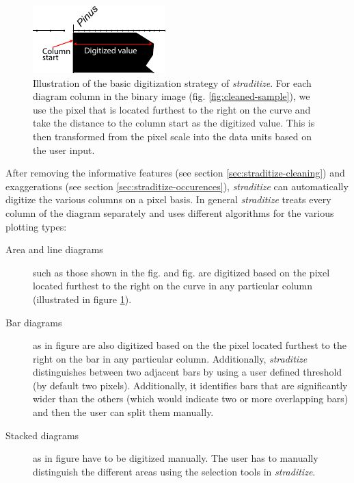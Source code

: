 \begin{refsection}
\begin{figure}
	\centering
	\includegraphics[width=0.5\linewidth]{straditize-figures/sample_diagram_digitize-explanation.pdf}
	\caption[Illustration of the basic digitization strategy of \emph{straditize}]{Illustration of the basic digitization strategy of \emph{straditize}. For each diagram column in the binary image (fig. \ref{fig:cleaned-sample}), we use the pixel that is located furthest to the right on the curve and take the distance to the column start as the digitized value. This is then transformed from the pixel scale into the data units based on the user input.}
	\label{fig:digitize-explanation}
\end{figure}

After removing the informative features (see section \ref{sec:straditize-cleaning}) and exaggerations (see section \ref{sec:straditize-occurences}), \emph{straditize} can automatically digitize the various columns on a pixel basis. In general \emph{straditize} treats every column of the diagram separately and uses different algorithms for the various plotting types:

\begin{description}
	\item[Area and line diagrams] such as those shown in the fig. \samplediagram[f] and fig. \samplediagram[h]  are  digitized  based  on  the  pixel located furthest to the right on the curve in any particular column (illustrated in figure \ref{fig:digitize-explanation}).
	\item[Bar diagrams] as in figure \samplediagram[g] are also digitized based on the the pixel located furthest to the right on the bar in any particular column. Additionally, \emph{straditize} distinguishes between two adjacent bars by using a user defined threshold (by default two pixels). Additionally, it identifies bars that are significantly wider than the others (which would indicate two or more overlapping bars) and then the user can split them manually.
	\item[Stacked diagrams] as in figure \samplediagram[i] have to be digitized manually. The user has to manually distinguish the different areas using the selection tools in \emph{straditize}.
\end{description}


\end{refsection}
